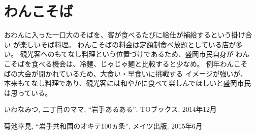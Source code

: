 \documentclass[twocolumn]{jarticle} %
\begin{document}
\section{わんこそば}
おわんに入った一口大のそばを、客が食べるたびに給仕が補給するという掛け合い
が楽しいそば料理。
わんこそばの料金は定額制食べ放題としている店が多い。
観光客へのもてなし料理という位置づけであるため、盛岡市民自身が
わんこそばを食べる機会は、冷麺、じゃじゃ麺と比較すると少なめ。
例年わんこそばの大会が開かれているため、大食い・早食いに挑戦する
イメージが強いが、
本来もてなし料理であり、観光客には和やかに食べて楽しんでほしいと盛岡市民は思っている。



\begin{thebibliography}{9}%

いわなみつ, 二丁目のママ, ``岩手あるある'', TOブックス, 2014年12月

菊池幸見, ``岩手共和国のオキテ100ヵ条'', メイツ出版, 2015年6月
\end{thebibliography}
\end{document}
